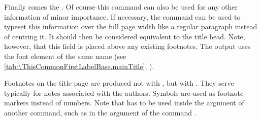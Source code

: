 \BeginIndexGroup{}%
%
Finally comes the
. Of course this command can also
be used for any other information of minor importance. If necessary, the
 command can be used to typeset this information over the full
page width like a regular paragraph instead of centring it. It should then be
considered equivalent to the title head. Note, however, that this field is
placed above any existing footnotes. The output uses the font 
element of the same name (see
\autoref{tab:\ThisCommonFirstLabelBase.mainTitle},
).%
\EndIndexGroup

Footnotes on the title page are
produced not with , but with . They serve
typically for notes associated with the authors. Symbols are used as footnote
markers instead of numbers. Note that  has
to be used inside the argument of another command, such as in the 
 argument of the command .
%

